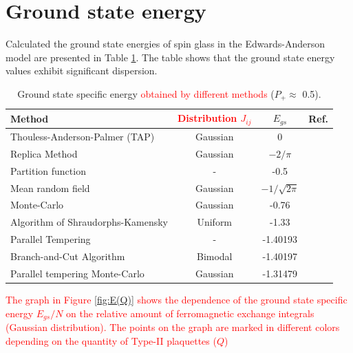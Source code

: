 \documentclass[preprint,12pt]{elsarticle}
\begin{document}
	\section{Ground state energy}
	
	Calculated the ground state energies of spin glass in the Edwards-Anderson model are presented in Table \ref{tab:Egs}. The table shows that the ground state energy values exhibit significant dispersion.
	
	\begin{table}[h]
		\begin{tabular}{|l|c|c|l|}
			\hline
			Method     &     \textcolor{red}{Distribution $J_{ij}$}                         &
			$E_{gs}$                                       &  Ref.                                          \\ \hline
			Thouless-Anderson-Palmer (TAP)& Gaussian &  0                                              & \cite{thouless1977solution}    \\ \hline
			Replica Method   & Gaussian                         & $-2/\pi$                                       & \cite{sherrington1975solvable} \\ \hline
			Partition function   &   -                 & -0.5                                           & \cite{tanaka1980analytic}      \\ \hline
			Mean random field  &   Gaussian  &                   $-1/\sqrt{2\pi}$                               & \cite{klein1976comparison}     \\ \hline
			Monte-Carlo      &   Gaussian    &        -0.76                                          & \cite{kirkpatrick1978infinite} \\ \hline
			Algorithm of Shraudorphs-Kamensky   &  Uniform &     -1.33                                          & \cite{karandashev2019global}   \\ \hline
			Parallel Tempering &   -       & -1.40193                                       & \cite{palmer1999ground}        \\ \hline
			Branch-and-Cut Algorithm  & Bimodal               & -1.40197                         
			& \cite{campbell2004energy}      \\ \hline
			
			Parallel tempering Monte-Carlo    &  Gaussian         & -1.31479                                       & \cite{roma2009ground}          \\ \hline
			
			
			
		\end{tabular}
		\caption{Ground state specific energy \textcolor{red}{obtained by different methods} ($P_+\approx$ 0.5).}
		\label{tab:Egs}
	\end{table}
	\textcolor{red}{
		The graph in Figure \ref{fig:E(Q)} shows the dependence of the ground state specific energy $E_{gs}/N$ on the relative amount of ferromagnetic exchange integrals (Gaussian distribution). The points on the graph are marked in different colors depending on the quantity of Type-II plaquettes ($Q$)}
	
\end{document}
